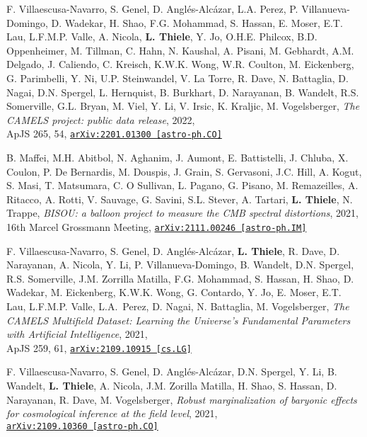 F. Villaescusa-Navarro, S. Genel, D. Angl\'es-Alc\'azar,
L.A. Perez, P. Villanueva-Domingo, D. Wadekar, H. Shao,
F.G. Mohammad, S. Hassan, E. Moser, E.T. Lau, L.F.M.P. Valle, A. Nicola,
{\bf L. Thiele}, Y. Jo, O.H.E. Philcox, B.D. Oppenheimer, M. Tillman, C. Hahn,
N. Kaushal, A. Pisani, M. Gebhardt, A.M. Delgado, J. Caliendo,
C. Kreisch, K.W.K. Wong, W.R. Coulton, M. Eickenberg,
G. Parimbelli, Y. Ni, U.P. Steinwandel, V. La Torre,
R. Dave, N. Battaglia, D. Nagai, D.N. Spergel, L. Hernquist, B. Burkhart,
D. Narayanan, B. Wandelt, R.S. Somerville, G.L. Bryan, M. Viel, Y. Li, V. Irsic,
K. Kraljic, M. Vogelsberger,
\emph{The CAMELS project: public data release}, 2022,\\
ApJS 265, 54,
\href{https://arxiv.org/abs/2201.01300}{\mbox{\texttt{arXiv:2201.01300 [astro-ph.CO]}}}

B. Maffei, M.H. Abitbol, N. Aghanim, J. Aumont, E. Battistelli, J. Chluba,
X. Coulon, P. De Bernardis, M. Douspis, J. Grain, S. Gervasoni, J.C. Hill,
A. Kogut, S. Masi, T. Matsumara, C. O Sullivan, L. Pagano, G. Pisano,
M. Remazeilles, A. Ritacco, A. Rotti, V. Sauvage, G. Savini, S.L. Stever,
A. Tartari, {\bf L. Thiele}, N. Trappe,
\emph{BISOU: a balloon project to measure the CMB spectral distortions}, 2021,\\
16th Marcel Grossmann Meeting,
\href{https://arxiv.org/abs/2111.00246}{\mbox{\texttt{arXiv:2111.00246 [astro-ph.IM]}}}

F. Villaescusa-Navarro, S. Genel, D. Angl\'es-Alc\'azar, {\bf L. Thiele},
R. Dave, D. Narayanan, A. Nicola, Y. Li, P. Villanueva-Domingo, B. Wandelt,
D.N. Spergel, R.S. Somerville, J.M. Zorrilla Matilla, F.G. Mohammad, S. Hassan,
H. Shao, D. Wadekar, M. Eickenberg, K.W.K. Wong, G. Contardo, Y. Jo, E. Moser,
E.T. Lau, L.F.M.P. Valle, L.A.~Perez, D. Nagai, N. Battaglia, M. Vogelsberger,
\emph{The CAMELS Multifield Dataset: Learning the Universe's Fundamental
      Parameters with Artificial Intelligence}, 2021,\\
ApJS 259, 61,
\href{https://arxiv.org/abs/2109.10915}{\mbox{\texttt{arXiv:2109.10915 [cs.LG]}}}

F. Villaescusa-Navarro, S. Genel, D. Angl\'es-Alc\'azar, D.N. Spergel, Y. Li,
B. Wandelt, {\bf L. Thiele}, A. Nicola, J.M. Zorilla Matilla, H. Shao,
S. Hassan, D. Narayanan, R. Dave, M. Vogelsberger,
\emph{Robust marginalization of baryonic effects for cosmological inference
      at the field level}, 2021,\\
\href{https://arxiv.org/abs/2109.10360}{\mbox{\texttt{arXiv:2109.10360 [astro-ph.CO]}}}

